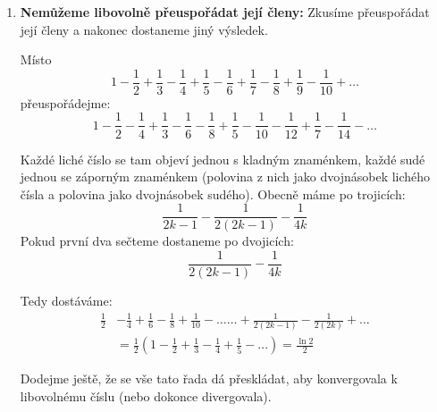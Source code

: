 {\begin{enumerate}
		\item  \textbf{Nemůžeme libovolně přeuspořádat její členy:}
			Zkusíme přeuspořádat její členy a nakonec dostaneme jiný výsledek.

			Místo
			$$1 - \frac{1}{2} + \frac{1}{3} - \frac{1}{4} + \frac{1}{5} - \frac{1}{6} + \frac{1}{7} - \frac{1}{8} + \frac{1}{9} - \frac{1}{10} + \ldots$$
			přeuspořádejme:
			$$1 - \frac{1}{2} - \frac{1}{4} + \frac{1}{3} - \frac{1}{6} - \frac{1}{8} + \frac{1}{5} - \frac{1}{10} - \frac{1}{12} + \frac{1}{7} - \frac{1}{14} - \ldots$$

			Každé liché číslo se tam objeví jednou s kladným znaménkem, každé sudé jednou se záporným znaménkem (polovina z nich jako dvojnásobek lichého čísla a polovina jako dvojnásobek sudého).
			Obecně máme po trojicích:
			$$\frac{1}{2k - 1} - \frac{1}{2(2k - 1)} - \frac{1}{4k}$$
			Pokud první dva sečteme dostaneme po dvojicích:
			$$\frac{1}{2(2k-1)} - \frac{1}{4k}$$

			Tedy dostáváme:
			\begin{align*}
				\frac{1}{2} &- \frac{1}{4} + \frac{1}{6} - \frac{1}{8} + \frac{1}{10} - \ldots \ldots + \frac{1}{2(2k-1)} - \frac{1}{2(2k)} + \ldots \\
				&= \frac{1}{2} \left( 1 - \frac{1}{2} + \frac{1}{3} - \frac{1}{4} + \frac{1}{5} - \ldots \right) = \frac{\ln 2}{2}
			\end{align*}

			Dodejme ještě, že se vše tato řada dá přeskládat, aby konvergovala k libovolnému číslu (nebo dokonce divergovala).

	\end{enumerate}
}

